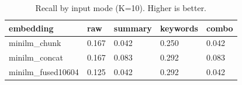 \begin{table}
\caption{Recall by input mode (K=10). Higher is better.}
\label{tab:recall-by-mode}
\begin{tabular}{lllll}
\toprule
embedding & raw & summary & keywords & combo \\
\midrule
minilm_chunk & 0.167 & 0.042 & 0.250 & 0.042 \\
minilm_concat & 0.167 & 0.083 & 0.292 & 0.083 \\
minilm_fused10604 & 0.125 & 0.042 & 0.292 & 0.042 \\
\bottomrule
\end{tabular}
\end{table}
